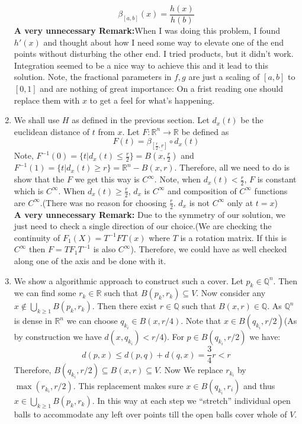 \documentclass[oneside]{book}\twocolumn
\begin{document}
\begin{enumerate}
    $$\beta_{[a,b]}(x)=\frac{h(x)}{h(b)}$$
    \textbf{A very unnecessary Remark:}When I was doing this problem, I found $h'(x)$ and thought about how I need some way to elevate one of the end points without disturbing the other end. I tried products, but it didn't work. Integration seemed to be a nice way to achieve this and it lead to this solution. Note, the fractional parameters in $f,g$ are just a scaling of $[a,b]$ to $[0,1]$ and are nothing of great importance: On a frist reading one should replace them with $x$ to get a feel for what's happening.
    \item We shall use $H$ as defined in the previous section. Let $d_x(t)$ be the euclidean distance of $t$ from $x$. Let $F:\mathbb R^n\to \mathbb R$ be defined as $$F(t)=\beta_{\left[\frac{r}{2},r\right]}\circ d_x(t)$$
    Note, $F^{-1}(0)=\{t|d_x(t)\leq \frac{r}{2}\}=\overline{B(x,\frac{r}{2})}$ and $F^{-1}(1)=\{t|d_x(t)\geq r\}=\mathbb R^n-B(x,r)$. Therefore, all we need to do is show that the $F$ we get this way is $C^\infty$. Note, when $d_x(t)<\frac{r}{2}$, $F$ is constant which is $C^\infty$. When $d_x(t)\geq\frac{r}{2}$, $d_x$ is $C^\infty$ and composition of $C^\infty$ functions are $C^\infty$.(There was no reason for choosing $\frac{r}{2}$. $d_x$ is not $C^\infty$ only at $t=x$)\\
    \textbf{A very unnecessary Remark:} Due to the symmetry of our solution, we just need to check a single direction of our choice.(We are checking the continuity of $F_1(X)=T^{-1}FT(x)$ where $T$ is a rotation matrix. If this is $C^\infty$ then $F=TF_1T^{-1}$ is also $C^\infty$). Therefore, we could have as well checked along one of the axis and be done with it.
    \item  We show a algorithmic approach  to construct such a cover. Let $p_k\in\mathbb Q^n$. Then we can find some $r_k\in\mathbb R$ such that $B(p_k,r_k)\subseteq V$. Now consider any $x\notin \bigcup_{k\geq 1}B(p_k,r_k)$. Then there exist $r\in\mathbb Q$ such that $B(x,r)\in\mathbb Q$. As $\mathbb Q^n$ is dense in $\mathbb R^n$ we can choose $q_{k_i}\in B(x,r/4)$. Note that $x\in B(q_{k_i},r/2)$(As by construction we have $d(x,q_{k_i})<r/4$).  For $p\in B(q_{k_i},r/2)$ we have:
    $$d(p,x)\leq d(p,q)+d(q,x)=\frac{3}{4}r<r$$
    Therefore,  $B(q_{k_i},r/2)\subseteq B(x,r)\subseteq V$. Now We replace $r_{k_i}$ by $\max(r_{k_i},r/2)$. This replacement makes sure $x\in B(q_{k_i},r_i)$ and thus $x\in \bigcup_{k\geq 1}B(p_k,r_k)$. In this way at each step we ``stretch'' individual open balls to accommodate any left over points till the open balls cover whole of $V$.
\end{enumerate}
\end{document}

